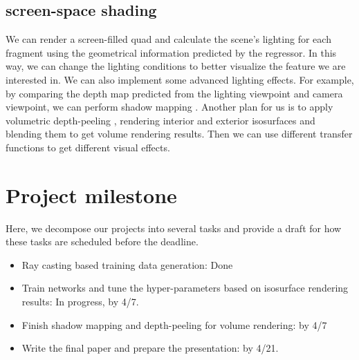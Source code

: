 \documentclass[journal]{vgtc}                %
\begin{document}
\subsection{screen-space shading}
\label{subsection:shading}
We can render a screen-filled quad and calculate the scene's lighting for each fragment using the geometrical information predicted by the regressor. In this way, we can change the lighting conditions to better visualize the feature we are interested in. We can also implement some advanced lighting effects. For example, by comparing the depth map predicted from the lighting viewpoint and camera viewpoint, we can perform shadow mapping \cite{williams1978casting}. Another plan for us is to apply volumetric depth-peeling \cite{zolt2003depthpeel},  rendering interior and exterior isosurfaces and blending them to get volume rendering results. Then we can use different transfer functions to get different visual effects.  


\section{Project milestone}

Here, we decompose our projects into several tasks and provide a draft for how these tasks are scheduled before the deadline.

\begin{itemize}
\item Ray casting based training data generation: Done
\item Train networks and tune the hyper-parameters based on isosurface rendering results: In progress, by 4/7.
\item Finish shadow mapping and depth-peeling for volume rendering: by 4/7
\item Write the final paper and prepare the presentation: by 4/21. 

\end{itemize}

%

%
%
%


\end{document}
